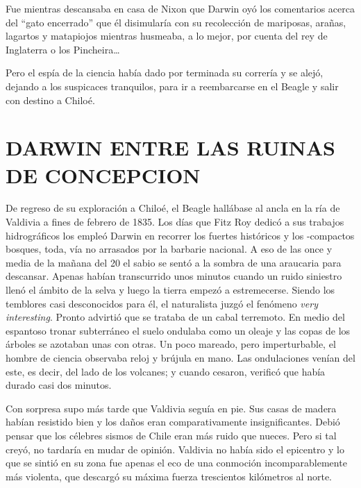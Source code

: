 \documentclass[10pt,twoside,openright]{memoir}
\begin{document}
Fue mientras descansaba en casa de Nixon que Darwin oyó los comentarios
acerca del ``gato encerrado'' que él disimularía con su recolección de
mariposas, arañas, lagartos y matapiojos mientras husmeaba, a lo mejor,
por cuenta del rey de Inglaterra o los Pincheira\ldots

Pero el espía de la ciencia había dado por terminada su correría y se
alejó, dejando a los suspicaces tranquilos, para ir a reembarcarse en el
Beagle y salir con destino a Chiloé.

\chapter{DARWIN ENTRE LAS RUINAS DE CONCEPCION}

De regreso de su exploración a Chiloé, el Beagle hallábase al ancla en
la ría de Valdivia a fines de febrero de 1835. Los días que Fitz Roy
dedicó a sus trabajos hidrográficos los empleó Darwin en recorrer los
fuertes históricos y los -compactos bosques, toda, vía no arrasados por
la barbarie nacional. A eso de las once y media de la mañana del 20 el
sabio se sentó a la sombra de una araucaria para descansar. Apenas
habían transcurrido unos minutos cuando un ruido siniestro llenó el
ámbito de la selva y luego la tierra empezó a estremecerse. Siendo los
temblores casi desconocidos para él, el naturalista juzgó el fenómeno
\emph{very interesting}. Pronto advirtió que se trataba de un cabal
terremoto. En medio del espantoso tronar subterráneo el suelo ondulaba
como un oleaje y las copas de los árboles se azotaban unas con otras. Un
poco mareado, pero imperturbable, el hombre de ciencia observaba reloj y
brújula en mano. Las ondulaciones venían del este, es decir, del lado de
los volcanes; y cuando cesaron, verificó que había durado casi dos
minutos.

Con sorpresa supo más tarde que Valdivia seguía en pie. Sus casas de
madera habían resistido bien y los daños eran comparativamente
insignificantes. Debió pensar que los célebres sismos de Chile eran más
ruido que nueces. Pero si tal creyó, no tardaría en mudar de opinión.
Valdivia no había sido el epicentro y lo que se sintió en su zona fue
apenas el eco de una conmoción incomparablemente más violenta, que
descargó su máxima fuerza trescientos kilómetros al norte.
\end{document}
